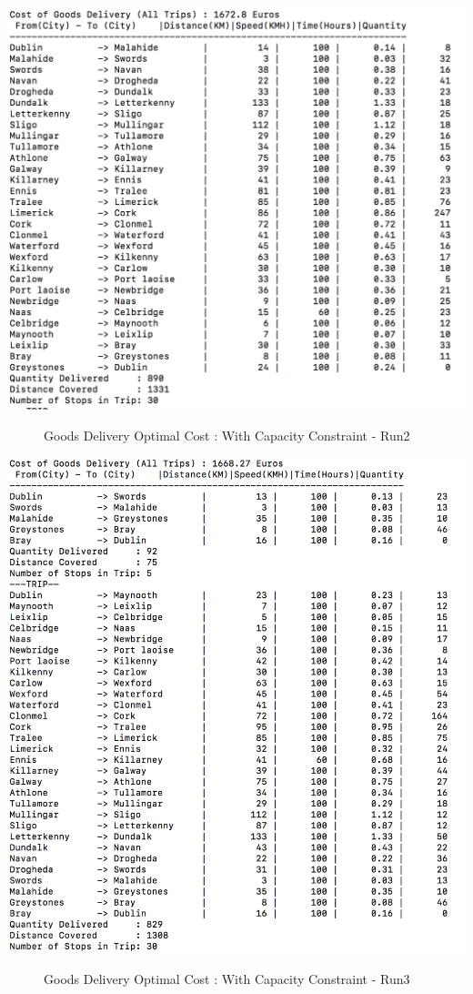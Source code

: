 \documentclass[a4paper&11pt]{article}
\begin{document}
\begin{center}
\includegraphics[scale=0.8]{30fig2.png}
\begin{figure}[H]
\caption{Goods Delivery Optimal Cost :  With Capacity Constraint - Run2}
\end{figure}
\end{center}

\begin{center}
\includegraphics[scale=0.8]{30fig3.png}
\begin{figure}[H]
\caption{Goods Delivery Optimal Cost :  With Capacity Constraint - Run3}
\end{figure}
\end{center}
\end{document}
